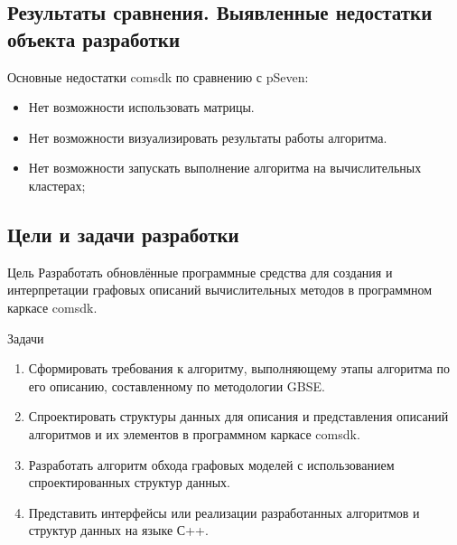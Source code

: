 \subsection{Результаты сравнения. Выявленные недостатки объекта разработки}
\begin{frame}
    Основные недостатки comsdk по сравнению с pSeven:
    \begin{itemize}
        \item Нет возможности использовать матрицы.
        \item Нет возможности визуализировать результаты работы алгоритма.
        \item Нет возможности запускать выполнение алгоритма на вычислительных кластерах;
    \end{itemize}
\end{frame}

\subsection{Цели и задачи разработки}
\begin{frame}

    \begin{block}{Цель}
        Разработать обновлённые программные средства для создания и интерпретации графовых описаний вычислительных методов в программном каркасе comsdk.
    \end{block}

    \begin{block}{Задачи}
        \begin{enumerate}
            \item Сформировать требования к алгоритму, выполняющему этапы алгоритма по его описанию, составленному по методологии GBSE.
            \item Спроектировать структуры данных для описания и представления описаний алгоритмов и их элементов в программном каркасе comsdk.
            \item Разработать алгоритм обхода графовых моделей с использованием спроектированных структур данных.
            \item Представить интерфейсы или реализации разработанных алгоритмов и структур данных на языке С++.
        \end{enumerate}
    \end{block}

\end{frame}
